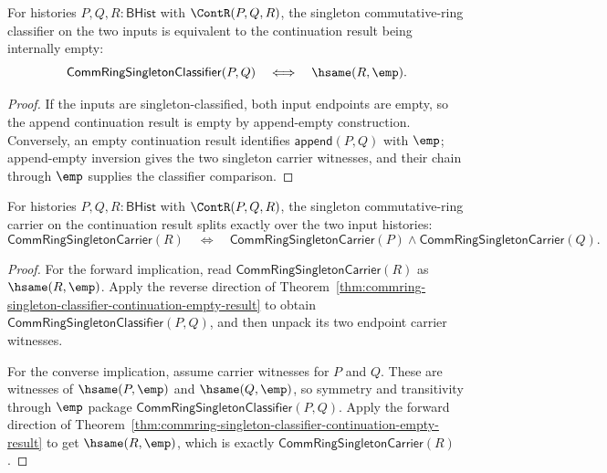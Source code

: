 \begin{theorem}
\label{thm:commring-singleton-classifier-continuation-empty-result}
For histories $P,Q,R:\mathsf{BHist}$ with $\ContR(P,Q,R)$, the singleton
commutative-ring classifier on the two inputs is equivalent to the continuation
result being internally empty:
$$
\mathsf{CommRingSingletonClassifier}(P,Q)
\quad\Longleftrightarrow\quad
\hsame(R,\emp).
$$
\end{theorem}
\begin{proof}
If the inputs are singleton-classified, both input endpoints are empty, so the
append continuation result is empty by append-empty construction. Conversely,
an empty continuation result identifies $\mathsf{append}(P,Q)$ with $\emp$;
append-empty inversion gives the two singleton carrier witnesses, and their
chain through $\emp$ supplies the classifier comparison.
\end{proof}

\begin{theorem}
\label{thm:commring-singleton-continuation-carrier-split}
For histories $P,Q,R:\mathsf{BHist}$ with $\ContR(P,Q,R)$, the singleton
commutative-ring carrier on the continuation result splits exactly over the two
input histories:
$$
\mathsf{CommRingSingletonCarrier}(R)
\quad\Longleftrightarrow\quad
\mathsf{CommRingSingletonCarrier}(P)\land
\mathsf{CommRingSingletonCarrier}(Q).
$$
\end{theorem}
\begin{proof}
For the forward implication, read
$\mathsf{CommRingSingletonCarrier}(R)$ as $\hsame(R,\emp)$. Apply the reverse
direction of
Theorem~\ref{thm:commring-singleton-classifier-continuation-empty-result} to
obtain $\mathsf{CommRingSingletonClassifier}(P,Q)$, and then unpack its two
endpoint carrier witnesses.

For the converse implication, assume carrier witnesses for $P$ and $Q$. These
are witnesses of $\hsame(P,\emp)$ and $\hsame(Q,\emp)$, so symmetry and
transitivity through $\emp$ package
$\mathsf{CommRingSingletonClassifier}(P,Q)$. Apply the forward direction of
Theorem~\ref{thm:commring-singleton-classifier-continuation-empty-result} to get
$\hsame(R,\emp)$, which is exactly
$\mathsf{CommRingSingletonCarrier}(R)$.
\end{proof}

